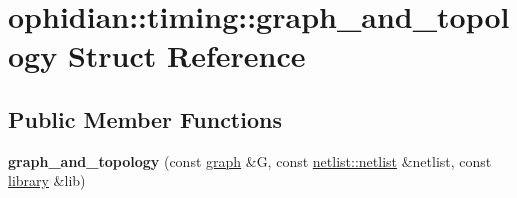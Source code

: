 \hypertarget{structophidian_1_1timing_1_1graph__and__topology}{\section{ophidian\-:\-:timing\-:\-:graph\-\_\-and\-\_\-topology Struct Reference}
\label{structophidian_1_1timing_1_1graph__and__topology}
}
\subsection*{Public Member Functions}
\begin{DoxyCompactItemize}
\item 
\hypertarget{structophidian_1_1timing_1_1graph__and__topology_a41dbf51df32b93f754082b1c1223739b}{{\bfseries graph\-\_\-and\-\_\-topology} (const \hyperlink{classophidian_1_1timing_1_1graph}{graph} \&G, const \hyperlink{classophidian_1_1netlist_1_1netlist}{netlist\-::netlist} \&netlist, const \hyperlink{classophidian_1_1timing_1_1library}{library} \&lib)}\label{structophidian_1_1timing_1_1graph__and__topology_a41dbf51df32b93f754082b1c1223739b}

\end{DoxyCompactItemize}
